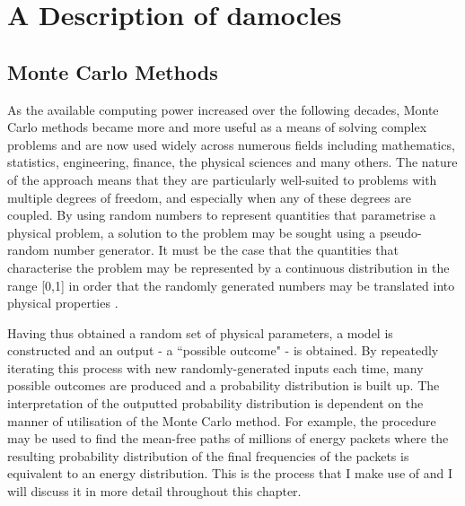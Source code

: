   \chapter{A Description of {\sc damocles}}\label{chp:chp2}

%
%


\section{Monte Carlo Methods}


As the available computing power increased over the following decades, Monte Carlo methods became more and more useful as a means of solving complex problems and are now used widely across numerous fields including mathematics, statistics, engineering, finance, the physical sciences and many others.  The nature of the approach means that they are particularly well-suited to problems with multiple degrees of freedom, and especially when any of these degrees are coupled.  By using random numbers to represent quantities that parametrise a physical problem, a solution to the problem may be sought using a pseudo-random number generator.   It must be the case that the quantities that characterise the problem may be represented by a continuous distribution in the range [0,1] in order that the randomly generated numbers may be translated into physical properties \citep{Shreider1966}.  

Having thus obtained a random set of physical parameters, a model is constructed and an output - a ``possible outcome" - is obtained.  By repeatedly iterating this process with new randomly-generated inputs each time, many possible outcomes are produced and a probability distribution is built up.  The interpretation of the outputted probability distribution is dependent on the manner of utilisation of the Monte Carlo method.  For example, the procedure may be used to find the mean-free paths of millions of energy packets where the resulting probability distribution of the final frequencies of the packets is equivalent to an energy distribution.  This is the process that I make use of and I will discuss it in more detail throughout this chapter.

